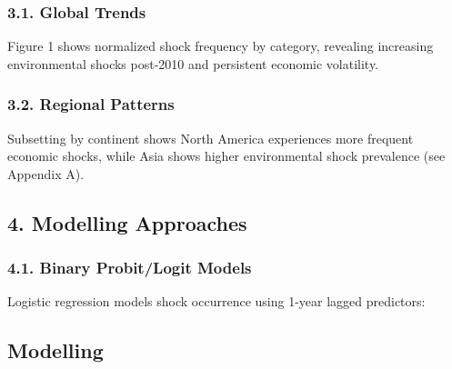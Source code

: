 \documentclass[
]{article}
\begin{document}
\subsubsection{3.1. Global Trends}\label{global-trends}

Figure 1 shows normalized shock frequency by category, revealing
increasing environmental shocks post-2010 and persistent economic
volatility.

\subsubsection{3.2. Regional Patterns}\label{regional-patterns}

Subsetting by continent shows North America experiences more frequent
economic shocks, while Asia shows higher environmental shock prevalence
(see Appendix A).

\subsection{4. Modelling Approaches}\label{modelling-approaches}

\subsubsection{4.1. Binary Probit/Logit
Models}\label{binary-probitlogit-models}

Logistic regression models shock occurrence using 1-year lagged
predictors:

\subsection{Modelling}\label{modelling}
\end{document}

